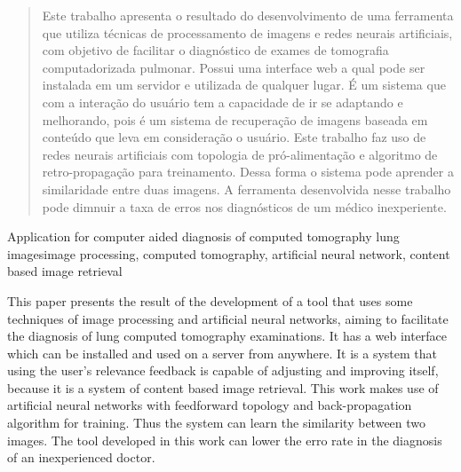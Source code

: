 \begin{abstract}
Este trabalho apresenta o resultado do desenvolvimento de uma ferramenta que utiliza técnicas de processamento de imagens e redes neurais artificiais, com objetivo de facilitar o diagnóstico de exames de tomografia computadorizada pulmonar. Possui uma interface web a qual pode ser instalada em um servidor e utilizada de qualquer lugar. É um sistema que com a interação do usuário tem a capacidade de ir se adaptando e melhorando, pois é um sistema de recuperação de imagens baseada em conteúdo que leva em consideração o usuário. Este trabalho faz uso de redes neurais artificiais com topologia de pró-alimentação e algoritmo de retro-propagação para treinamento. Dessa forma o sistema pode aprender a similaridade entre duas imagens. A ferramenta desenvolvida nesse trabalho pode dimnuir a taxa de erros nos diagnósticos de um médico inexperiente.

\end{abstract}


\begin{englishabstract}{Application for computer aided diagnosis of computed tomography lung images}{image processing, computed tomography, artificial neural network, content based image retrieval}

This paper presents the result of the development of a tool that uses some techniques of image processing and artificial neural networks, aiming to facilitate the diagnosis of lung computed tomography examinations. It has a web interface which can be installed and used on a server from anywhere. It is a system that using the user's relevance feedback is capable of adjusting and improving itself, because it is a system of content based image retrieval. This work makes use of artificial neural networks with feedforward topology and back-propagation algorithm for training. Thus the system can learn the similarity between two images. The tool developed in this work can lower the erro rate in the diagnosis of an inexperienced doctor.
\end{englishabstract}